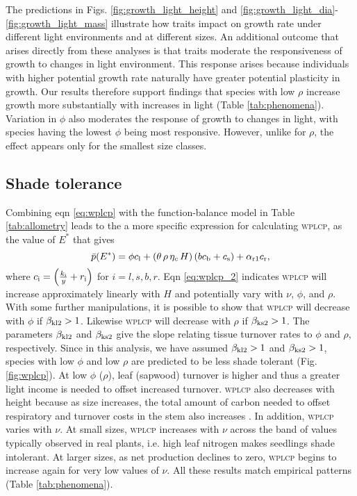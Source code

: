 \documentclass[9pt,twocolumn,twoside,lineno]{pnas-new}
\newcommand{\wplcp}{\textsc{wplcp}}
\begin{document}
The predictions in Figs. \ref{fig:growth_light_height} and \ref{fig:growth_light_dia}-\ref{fig:growth_light_mass} illustrate how traits impact on growth rate under different light environments and at different sizes. An additional outcome that arises directly from these analyses is that traits moderate the responsiveness of growth to changes in light environment. This response arises because individuals with higher potential growth rate naturally have greater potential plasticity in growth. Our results therefore support findings that species with low $\rho$ increase growth more substantially with increases in light (Table \ref{tab:phenomena}). Variation in $\phi$ also moderates the response of growth to changes in light, with species having the lowest $\phi$ being most responsive. However, unlike for $\rho$, the effect appears only for the smallest size classes.

\subsection{Shade tolerance}
Combining eqn \ref{eq:wplcp} with the function-balance model in Table \ref{tab:allometry} leads to the a more specific expression for calculating {\wplcp}, as the value of $E^*$ that gives
\begin{equation}\label{eq:wplcp_2}
\bar{p}(E^*) =
      \phi c_{\rm l} +
      \left(\theta \, \rho \, \eta_c \, H\right)
        \left(b c_{\rm b}
            + c_{\rm s}\right) +
      \alpha_{\rm r1} c_{\rm r},
\end{equation}
where $c_{\rm i} = \left(\frac{k_{\rm i}}{y} + r_{\rm i}\right)$ for $i=l,s,b,r$.
Eqn \ref{eq:wplcp_2} indicates {\wplcp} will increase approximately linearly with $H$ and potentially vary with $\nu$, $\phi$, and $\rho$. With some further manipulations, it is possible to show that {\wplcp} will decrease with $\phi$ if $\beta_{{\rm kl2}} >1$. Likewise {\wplcp} will decrease with $\rho$ if $\beta_{{\rm ks2}} >1$. The parameters $\beta_{{\rm kl2}}$ and $\beta_{{\rm ks2}}$ give the slope relating tissue turnover rates to $\phi$ and $\rho$, respectively. Since in this analysis, we have assumed $\beta_{{\rm kl2}} >1$ and $\beta_{{\rm ks2}} >1$, species with low $\phi$ and low $\rho$ are predicted to be less shade tolerant (Fig. \ref{fig:wplcp}). At low $\phi$ ($\rho$), leaf (sapwood) turnover is higher and thus a greater light income is needed to offset increased turnover. {\wplcp} also decreases with height because as size increases, the total amount of carbon needed to offset respiratory and turnover costs in the stem also increases \citep{Givnish-1988}. In addition, {\wplcp} varies with $\nu$. At small sizes, {\wplcp} increases with $\nu$ across the band of values typically observed in real plants, i.e. high leaf nitrogen makes seedlings shade intolerant. At larger sizes, as net production declines to zero, {\wplcp} begins to increase again for very low values of $\nu$. All these results  match empirical patterns (Table \ref{tab:phenomena}).
\end{document}
